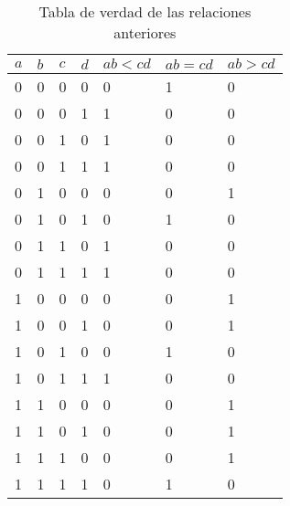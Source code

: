 \documentclass{article}
\begin{document}
\begin{enumerate}
{            \begin{table}[H]
                \caption{Tabla de verdad de las relaciones anteriores}
                \begin{center}
                    \begin{tabular}{|l|l|l|l|l|l|l|}
                        \hline
                        $a$ & $b$ & $c$ & $d$ & $ab<cd$ & $ab=cd$ & $ab>cd$ \\ \hline
                        0   & 0   & 0   & 0   & 0       & 1       & 0       \\ \hline
                        0   & 0   & 0   & 1   & 1       & 0       & 0       \\ \hline
                        0   & 0   & 1   & 0   & 1       & 0       & 0       \\ \hline
                        0   & 0   & 1   & 1   & 1       & 0       & 0       \\ \hline
                        0   & 1   & 0   & 0   & 0       & 0       & 1       \\ \hline
                        0   & 1   & 0   & 1   & 0       & 1       & 0       \\ \hline
                        0   & 1   & 1   & 0   & 1       & 0       & 0       \\ \hline
                        0   & 1   & 1   & 1   & 1       & 0       & 0       \\ \hline
                        1   & 0   & 0   & 0   & 0       & 0       & 1       \\ \hline
                        1   & 0   & 0   & 1   & 0       & 0       & 1       \\ \hline
                        1   & 0   & 1   & 0   & 0       & 1       & 0       \\ \hline
                        1   & 0   & 1   & 1   & 1       & 0       & 0       \\ \hline
                        1   & 1   & 0   & 0   & 0       & 0       & 1       \\ \hline
                        1   & 1   & 0   & 1   & 0       & 0       & 1       \\ \hline
                        1   & 1   & 1   & 0   & 0       & 0       & 1       \\ \hline
                        1   & 1   & 1   & 1   & 0       & 1       & 0       \\ \hline
                    \end{tabular}
                \end{center}

\end{table}}
\end{enumerate}
\end{document}
